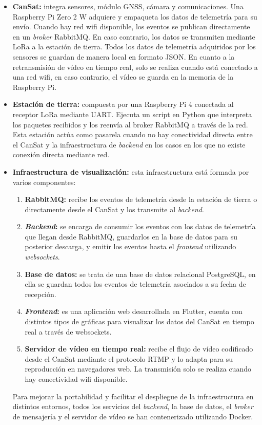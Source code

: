 \begin{itemize}
    \item \textbf{CanSat: }integra sensores, módulo GNSS, cámara y comunicaciones.
    Una Raspberry Pi Zero 2 W adquiere y empaqueta los datos de telemetría para su envío.
    Cuando hay red wifi disponible, los eventos se publican directamente en un \emph{broker} RabbitMQ. En caso contrario, los datos se transmiten mediante LoRa a la estación de tierra.
    Todos los datos de telemetría adquiridos por los sensores se guardan de manera local en formato JSON.
    En cuanto a la retransmisión de vídeo en tiempo real, solo se realiza cuando está conectado a una red wifi, en caso contrario, el vídeo se guarda en la memoria de la Raspberry Pi.

    \item \textbf{Estación de tierra: }compuesta por una Raspberry Pi 4 conectada al receptor LoRa mediante UART.
    Ejecuta un script en Python que interpreta los paquetes recibidos y los reenvía al broker RabbitMQ a través de la red.
    Esta estación actúa como pasarela cuando no hay conectividad directa entre el CanSat y la infraestructura de \emph{backend} en los casos en los que no existe conexión directa mediante red.

    \item \textbf{Infraestructura de visualización: } esta infraestructura está formada por varios componentes:
    \begin{enumerate}
        \item \textbf{RabbitMQ: } recibe los eventos de telemetría desde la estación de tierra o directamente desde el CanSat y los transmite al \emph{backend}.
        \item \textbf{\emph{Backend}: } se encarga de consumir los eventos con los datos de telemetría que llegan desde RabbitMQ,
        guardarlos en la base de datos para su posterior descarga, y emitir los eventos hasta el \emph{frontend} utilizando \emph{websockets}.
        \item \textbf{Base de datos: } se trata de una base de datos relacional PostgreSQL, en ella se guardan todos los eventos de telemetría asociados a su fecha de recepción.
        \item \textbf{\emph{Frontend}: } es una aplicación web desarrollada en Flutter, cuenta con distintos tipos de gráficas para visualizar los datos del CanSat en tiempo real a través de websockets.
        \item \textbf{Servidor de vídeo en tiempo real:} recibe el flujo de vídeo codificado desde el CanSat mediante el protocolo RTMP y lo adapta para su reproducción en navegadores web.
        La transmisión solo se realiza cuando hay conectividad wifi disponible.
    \end{enumerate}
    Para mejorar la portabilidad y facilitar el despliegue de la infraestructura en distintos entornos, todos los servicios del \emph{backend}, la base de datos, el \emph{broker} de mensajería y el servidor de vídeo se han contenerizado utilizando Docker.
\end{itemize}
